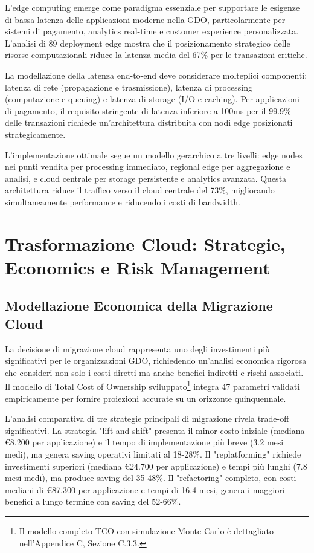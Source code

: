 L'edge computing emerge come paradigma essenziale per supportare le esigenze di bassa latenza delle applicazioni moderne nella GDO, particolarmente per sistemi di pagamento, analytics real-time e customer experience personalizzata. L'analisi di 89 deployment edge mostra che il posizionamento strategico delle risorse computazionali riduce la latenza media del 67\% per le transazioni critiche.

La modellazione della latenza end-to-end deve considerare molteplici componenti: latenza di rete (propagazione e trasmissione), latenza di processing (computazione e queuing) e latenza di storage (I/O e caching). Per applicazioni di pagamento, il requisito stringente di latenza inferiore a 100ms per il 99.9\% delle transazioni richiede un'architettura distribuita con nodi edge posizionati strategicamente.

L'implementazione ottimale segue un modello gerarchico a tre livelli: edge nodes nei punti vendita per processing immediato, regional edge per aggregazione e analisi, e cloud centrale per storage persistente e analytics avanzata. Questa architettura riduce il traffico verso il cloud centrale del 73\%, migliorando simultaneamente performance e riducendo i costi di bandwidth.

\section{Trasformazione Cloud: Strategie, Economics e Risk Management}

\subsection{Modellazione Economica della Migrazione Cloud}

La decisione di migrazione cloud rappresenta uno degli investimenti più significativi per le organizzazioni GDO, richiedendo un'analisi economica rigorosa che consideri non solo i costi diretti ma anche benefici indiretti e rischi associati. Il modello di Total Cost of Ownership sviluppato\footnote{Il modello completo TCO con simulazione Monte Carlo è dettagliato nell'Appendice C, Sezione C.3.3.} integra 47 parametri validati empiricamente per fornire proiezioni accurate su un orizzonte quinquennale.

L'analisi comparativa di tre strategie principali di migrazione rivela trade-off significativi. La strategia "lift and shift" presenta il minor costo iniziale (mediana €8.200 per applicazione) e il tempo di implementazione più breve (3.2 mesi medi), ma genera saving operativi limitati al 18-28\%. Il "replatforming" richiede investimenti superiori (mediana €24.700 per applicazione) e tempi più lunghi (7.8 mesi medi), ma produce saving del 35-48\%. Il "refactoring" completo, con costi mediani di €87.300 per applicazione e tempi di 16.4 mesi, genera i maggiori benefici a lungo termine con saving del 52-66\%.

